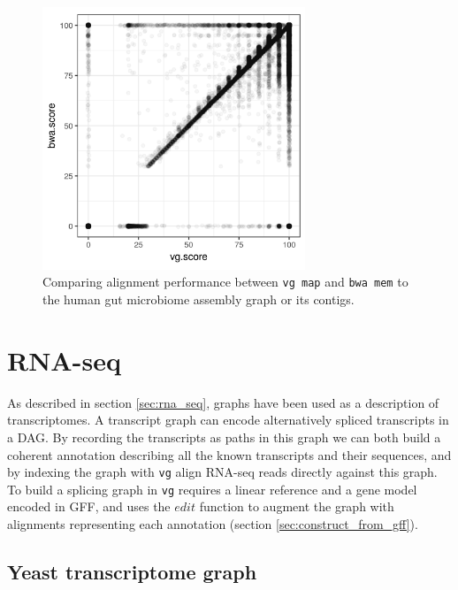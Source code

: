 \begin{figure}[htbp!]
  \centering
  \includegraphics[width=0.7\textwidth]{Chapter3/Figs/human_gut_microbiome_SRS105153_holdout_vg_vs_bwa_scatter.png}
  \caption[Human gut microbiome alignment comparison]{
    Comparing alignment performance between {\tt vg map} and {\tt bwa mem} to the human gut microbiome assembly graph or its contigs.
  }
  \label{fig:human_gut_microbiome_scatter}
\end{figure}


\section{RNA-seq}

As described in section \ref{sec:rna_seq}, graphs have been used as a description of transcriptomes.
A transcript graph can encode alternatively spliced transcripts in a DAG.
By recording the transcripts as paths in this graph we can both build a coherent annotation describing all the known transcripts and their sequences, and by indexing the graph with {\tt vg} align RNA-seq reads directly against this graph.
To build a splicing graph in {\tt vg} requires a linear reference and a gene model encoded in GFF, and uses the $edit$ function to augment the graph with alignments representing each annotation (section \ref{sec:construct_from_gff}).

\subsection{Yeast transcriptome graph}

